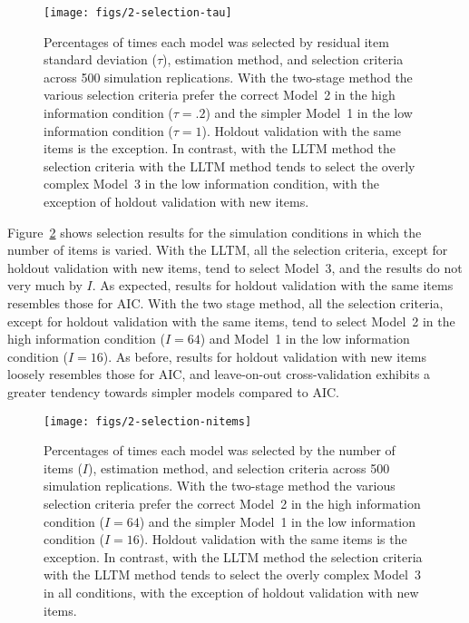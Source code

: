\begin{figure}
	\centering
	\texttt{[image: figs/2-selection-tau]}
	\caption{Percentages of times each model was selected by residual item standard deviation ($\tau$), estimation method, and selection criteria across 500 simulation replications. With the two-stage method the various selection criteria prefer the correct Model~2 in the high information condition ($\tau = .2$) and the simpler Model~1 in the low information condition ($\tau = 1$). Holdout validation with the same items is the exception. In contrast, with the LLTM method the selection criteria with the LLTM method tends to select the overly complex Model~3 in the low information condition, with the exception of holdout validation with new items.}		\label{fig:2-selection-tau}
\end{figure}

Figure~\ref{fig:2-selection-nitems} shows selection results for the simulation conditions in which the number of items is varied. With the LLTM, all the selection criteria, except for holdout validation with new items, tend to select Model~3, and the results do not very much by $I$. As expected, results for holdout validation with the same items resembles those for AIC. With the two stage method, all the selection criteria, except for holdout validation with the same items, tend to select Model~2 in the high information condition ($I=64$) and Model~1 in the low information condition ($I=16$). As before, results for holdout validation with new items loosely resembles those for AIC, and leave-on-out cross-validation exhibits a greater tendency towards simpler models compared to AIC.

\begin{figure}
	\centering
	\texttt{[image: figs/2-selection-nitems]}
	\caption{Percentages of times each model was selected by the number of items ($I$), estimation method, and selection criteria across 500 simulation replications. With the two-stage method the various selection criteria prefer the correct Model~2 in the high information condition ($I = 64$) and the simpler Model~1 in the low information condition ($I = 16$). Holdout validation with the same items is the exception. In contrast, with the LLTM method the selection criteria with the LLTM method tends to select the overly complex Model~3 in all conditions, with the exception of holdout validation with new items.}
	\label{fig:2-selection-nitems}
\end{figure}

